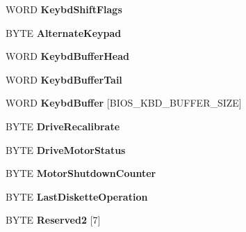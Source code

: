 \begin{DoxyCompactItemize}
W\+O\+RD {\bfseries Keybd\+Shift\+Flags}
\item 
\mbox{\label{struct_b_i_o_s___d_a_t_a___a_r_e_a_a1d1bab74a4ed38551bda29422d692616}} 
B\+Y\+TE {\bfseries Alternate\+Keypad}
\item 
\mbox{\label{struct_b_i_o_s___d_a_t_a___a_r_e_a_a2e7b36a6ef8a40bd28796683853f6752}} 
W\+O\+RD {\bfseries Keybd\+Buffer\+Head}
\item 
\mbox{\label{struct_b_i_o_s___d_a_t_a___a_r_e_a_a39e8ce59ea0b264cd4b0f00a0effd276}} 
W\+O\+RD {\bfseries Keybd\+Buffer\+Tail}
\item 
\mbox{\label{struct_b_i_o_s___d_a_t_a___a_r_e_a_a2c28deadcda350e592cfb474e3872390}} 
W\+O\+RD {\bfseries Keybd\+Buffer} \mbox{[}B\+I\+O\+S\+\_\+\+K\+B\+D\+\_\+\+B\+U\+F\+F\+E\+R\+\_\+\+S\+I\+ZE\mbox{]}
\item 
\mbox{\label{struct_b_i_o_s___d_a_t_a___a_r_e_a_afc71634e5971044c5d6f08c1592e85c1}} 
B\+Y\+TE {\bfseries Drive\+Recalibrate}
\item 
\mbox{\label{struct_b_i_o_s___d_a_t_a___a_r_e_a_a51a46f95beae920bd79bf2699306c465}} 
B\+Y\+TE {\bfseries Drive\+Motor\+Status}
\item 
\mbox{\label{struct_b_i_o_s___d_a_t_a___a_r_e_a_a532da62fa9cd53036cd79c2ca5b15258}} 
B\+Y\+TE {\bfseries Motor\+Shutdown\+Counter}
\item 
\mbox{\label{struct_b_i_o_s___d_a_t_a___a_r_e_a_aae61fe932eba29bb9df98769e0d59532}} 
B\+Y\+TE {\bfseries Last\+Diskette\+Operation}
\item 
\mbox{\label{struct_b_i_o_s___d_a_t_a___a_r_e_a_a956b7e8a8e11c6e19af4fb861f5bbab9}} 
B\+Y\+TE {\bfseries Reserved2} \mbox{[}7\mbox{]}
\item 
\mbox{\label{struct_b_i_o_s___d_a_t_a___a_r_e_a_a532f8980c739c213f2abaf6e979844c0}} 

\end{DoxyCompactItemize}
